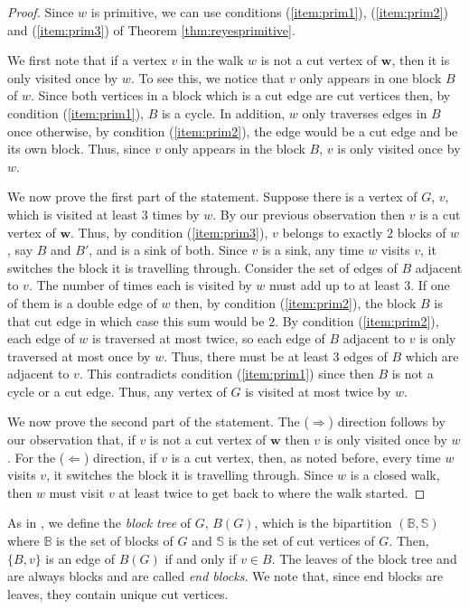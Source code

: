 \documentclass[a4paper, 12pt]{article}
\theoremstyle{plain}
\theoremstyle{definition}
\theoremstyle{remark}
\begin{document}
\begin{proof}
    Since $w$ is primitive, we can use conditions (\ref{item:prim1}), (\ref{item:prim2}) and (\ref{item:prim3}) of Theorem \ref{thm:reyesprimitive}. 

    We first note that if a vertex $v$ in the walk $w$ is not a cut vertex of $\mathbf{w}$, then it is only visited once by $w$. To see this, we notice that $v$ only appears in one block $B$ of $w$. Since both vertices in a block which is a cut edge are cut vertices then, by condition (\ref{item:prim1}), $B$ is a cycle. In addition, $w$ only traverses edges in $B$ once otherwise, by condition (\ref{item:prim2}), the edge would be a cut edge and be its own block. Thus, since $v$ only appears in the block $B$, $v$ is only visited once by $w$.
    
    We now prove the first part of the statement. Suppose there is a vertex of $G$, $v$, which is visited at least $3$ times by $w$. By our previous observation then $v$ is a cut vertex of $\mathbf{w}$. Thus, by condition (\ref{item:prim3}), $v$ belongs to exactly $2$ blocks of $w$, say $B$ and $B'$, and is a sink of both. Since $v$ is a sink, any time $w$ visits $v$, it switches the block it is travelling through. Consider the set of edges of $B$ adjacent to $v$. The number of times each is visited by $w$ must add up to at least $3$. If one of them is a double edge of $w$ then, by condition (\ref{item:prim2}), the block $B$ is that cut edge in which case this sum would be $2$. By condition (\ref{item:prim2}), each edge of $w$ is traversed at most twice, so each edge of $B$ adjacent to $v$ is only traversed at most once by $w$. Thus, there must be at least $3$ edges of $B$ which are adjacent to $v$. This contradicts condition (\ref{item:prim1}) since then $B$ is not a cycle or a cut edge. Thus, any vertex of $G$ is visited at most twice by $w$.

   We now prove the second part of the statement. The ($\Rightarrow$) direction follows by our observation that, if $v$ is not a cut vertex of $\mathbf{w}$ then $v$ is only visited once by $w$. For the ($\Leftarrow$) direction, if $v$ is a cut vertex, then, as noted before, every time $w$ visits $v$, it switches the block it is travelling through. Since $w$ is a closed walk, then $w$ must visit $v$ at least twice to get back to where the walk started.
\end{proof}

As in \cite[Section 4]{tatakis2011completeintersectiontoricideals}, we define the \textit{block tree} of $G$, $B(G)$, which is the bipartition $(\mathbb{B},\mathbb{S})$ where $\mathbb{B}$ is the set of blocks of $G$ and $\mathbb{S}$ is the set of cut vertices of $G$. Then, $\{B,v\}$ is an edge of $B(G)$ if and only if $v \in B$. The leaves of the block tree and are always blocks and are called \textit{end blocks}. We note that, since end blocks are leaves, they contain unique cut vertices.
\end{document}

